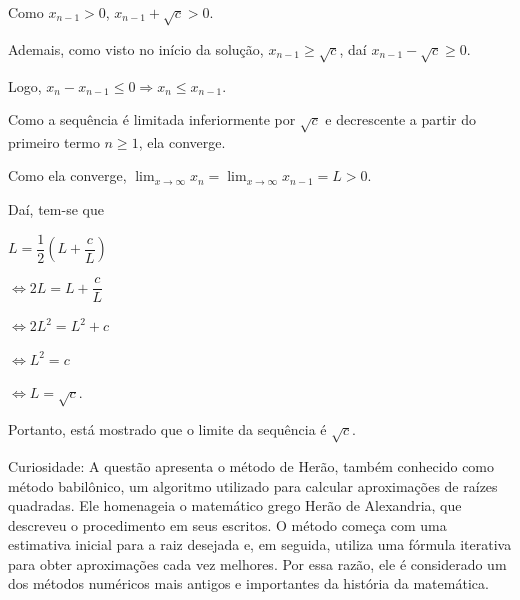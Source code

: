 \documentclass{hipatia}
\begin{document}
Como $x_{n-1}>0$, $x_{n-1}+\sqrt{c}>0$.

\vspace*{0.5cm}

Ademais, como visto no início da solução, $x_{n-1}\geq\sqrt{c}$, daí $x_{n-1}-\sqrt{c}\geq0$.

\vspace*{0.5cm}

Logo, $x_n-x_{n-1}\leq 0 \Rightarrow x_n\leq x_{n-1}$.

\vspace*{0.5cm}

Como a sequência é limitada inferiormente por $\sqrt{c}$ e decrescente a partir do primeiro termo $n\geq1$, ela converge.

\vspace*{0.5cm}

Como ela converge, $\lim_{x\to \infty}x_n = \lim_{x\to \infty}x_{n-1} = L > 0$.

\vspace*{0.5cm}

Daí, tem-se que

\begin{center}
$L=\dfrac{1}{2}(L+\dfrac{c}{L})$
\end{center}

\begin{center}
$\Leftrightarrow2L=L+\dfrac{c}{L}$
\end{center}

\begin{center}
$\Leftrightarrow2L^2=L^2+c$
\end{center}

\begin{center}
$\Leftrightarrow L^2=c$
\end{center}

\begin{center}
$\Leftrightarrow L=\sqrt{c}$.
\end{center}

Portanto, está mostrado que o limite da sequência é $\sqrt{c}$.

\vspace*{0.5cm}

Curiosidade: A questão apresenta o método de Herão, também conhecido como método babilônico, um algoritmo utilizado para calcular aproximações de raízes quadradas. Ele homenageia o matemático grego Herão de Alexandria, que descreveu o procedimento em seus escritos. O método começa com uma estimativa inicial para a raiz desejada e, em seguida, utiliza uma fórmula iterativa para obter aproximações cada vez melhores. Por essa razão, ele é considerado um dos métodos numéricos mais antigos e importantes da história da matemática.
\end{document}
